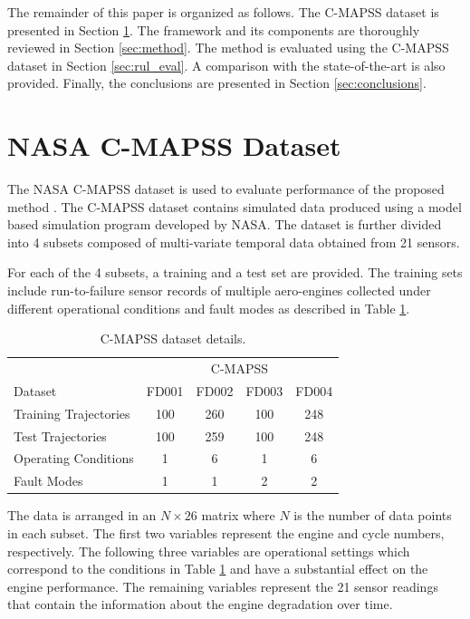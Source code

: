 \documentclass[preprint,12pt]{elsarticle}%
\begin{document}
The remainder of this paper is organized as follows. The C-MAPSS dataset is
presented in Section \ref{sec:rul_dataset}. The framework and its components
are thoroughly reviewed in Section \ref{sec:method}. The method is evaluated
using the C-MAPSS dataset in Section \ref{sec:rul_eval}. A comparison with the
state-of-the-art is also provided. Finally, the conclusions are presented in
Section \ref{sec:conclusions}.

\section{NASA C-MAPSS Dataset}
\label{sec:rul_dataset}

The NASA C-MAPSS dataset is used to evaluate performance of the proposed method \cite{Saxena2008a}. The C-MAPSS dataset contains simulated data produced using a model based simulation program developed by NASA. The dataset is further divided into 4 subsets composed of multi-variate temporal data obtained from 21 sensors.

For each of the 4 subsets, a training and a test set are provided. The training sets include run-to-failure sensor records of multiple aero-engines collected under different operational conditions and fault modes as described in Table \ref{table:CMAPSS}.

\begin{table}[H]
\begin{center}
\begin{tabular}
[c]{l|cccc}\hline
& \multicolumn{4}{c}{C-MAPSS}\\
Dataset & FD001 & FD002 & FD003 & FD004\\ \hline
Training Trajectories & 100 & 260 & 100 & 248\\
Test Trajectories & 100 & 259 & 100 & 248\\
Operating Conditions & 1 & 6 & 1 & 6\\
Fault Modes & 1 & 1 & 2 & 2\\\hline
\end{tabular}
\caption{C-MAPSS dataset details.}
\label{table:CMAPSS}
\end{center}
\end{table}


The data is arranged in an $N\times26$ matrix where $N$ is the number of data points in each subset. The first two variables represent the engine and cycle numbers, respectively. The following three variables are operational settings which correspond to the conditions in Table \ref{table:CMAPSS} and have a substantial effect on the engine performance. The remaining variables represent the 21 sensor readings that contain the information about the engine degradation over time.
\end{document}
